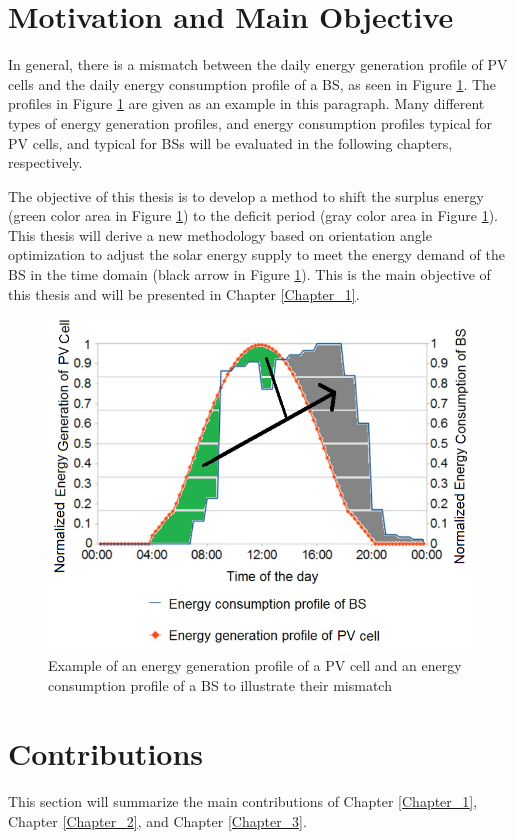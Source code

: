 \clearpage


\section{Motivation and Main Objective\label{Motivation_and_Objectives}}
In general, there is a mismatch between the daily energy generation profile of PV cells and the daily energy consumption profile of a BS, as seen in Figure \ref{bs}. The profiles in Figure \ref{bs} are given as an example in this paragraph. Many different types of energy generation profiles, and energy consumption profiles typical for PV cells, and typical for BSs will be evaluated in the following chapters, respectively. 

The objective of this thesis is to develop a method to shift the surplus energy (green color area in Figure \ref{bs}) to the deficit period (gray color area in Figure \ref{bs}). This thesis will derive a new methodology based on orientation angle optimization to adjust the solar energy supply to meet the energy demand of the
BS in the time domain (black arrow in Figure \ref{bs}). This is the main objective of this thesis and will be presented in Chapter \ref{Chapter_1}. 


\begin{figure}[H]
	\centering
		\includegraphics[width=0.7\columnwidth]{pictures/bs}
\caption{Example of an energy generation profile of a PV cell and an energy consumption profile of a BS to illustrate their mismatch\label{bs}}
\end{figure}



\clearpage
\section{Contributions\label{contributions}}
This section will summarize the main contributions of Chapter \ref{Chapter_1}, Chapter \ref{Chapter_2}, and Chapter \ref{Chapter_3}.


